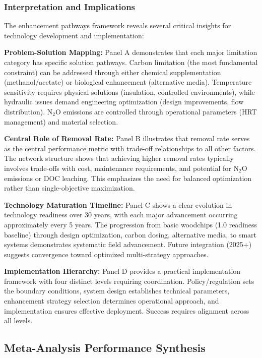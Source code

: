 \documentclass[12pt,a4paper]{article}
\begin{document}
\subsubsection{Interpretation and Implications}

The enhancement pathways framework reveals several critical insights for technology development and implementation:

\textbf{Problem-Solution Mapping:} Panel A demonstrates that each major limitation category has specific solution pathways. Carbon limitation (the most fundamental constraint) can be addressed through either chemical supplementation (methanol/acetate) or biological enhancement (alternative media). Temperature sensitivity requires physical solutions (insulation, controlled environments), while hydraulic issues demand engineering optimization (design improvements, flow distribution). N$_2$O emissions are controlled through operational parameters (HRT management) and material selection.

\textbf{Central Role of Removal Rate:} Panel B illustrates that removal rate serves as the central performance metric with trade-off relationships to all other factors. The network structure shows that achieving higher removal rates typically involves trade-offs with cost, maintenance requirements, and potential for N$_2$O emissions or DOC leaching. This emphasizes the need for balanced optimization rather than single-objective maximization.

\textbf{Technology Maturation Timeline:} Panel C shows a clear evolution in technology readiness over 30 years, with each major advancement occurring approximately every 5 years. The progression from basic woodchips (1.0 readiness baseline) through design optimization, carbon dosing, alternative media, to smart systems demonstrates systematic field advancement. Future integration (2025+) suggests convergence toward optimized multi-strategy approaches.

\textbf{Implementation Hierarchy:} Panel D provides a practical implementation framework with four distinct levels requiring coordination. Policy/regulation sets the boundary conditions, system design establishes technical parameters, enhancement strategy selection determines operational approach, and implementation ensures effective deployment. Success requires alignment across all levels.

\subsection{Meta-Analysis Performance Synthesis}
\end{document}
